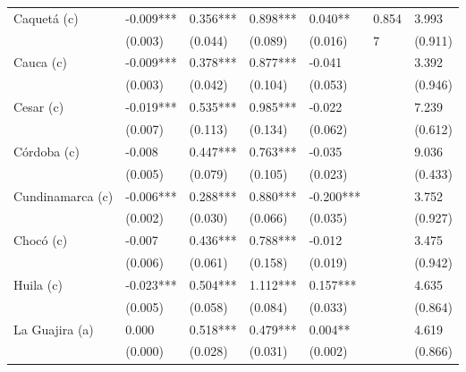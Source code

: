 \begin{table}
\begin{tabular}{lllllll}
\vspace{-0.3cm}Caquetá  (c) & -0.009*** & 0.356*** & 0.898*** & 0.040** & 0.854 & 3.993\\   
& \scriptsize{(0.003)} & \scriptsize{(0.044)} & \scriptsize{(0.089)} & \scriptsize{(0.016)} & \scriptsize{7}    & \scriptsize{(0.911)} \\
\vspace{-0.3cm}Cauca (c) & -0.009*** & 0.378*** & 0.877*** & -0.041 &       & 3.392\\   
& \scriptsize{(0.003)} & \scriptsize{(0.042)} & \scriptsize{(0.104)} & \scriptsize{(0.053)} &       & \scriptsize{(0.946)} \\
\vspace{-0.3cm}Cesar  (c) & -0.019*** & 0.535*** & 0.985*** & -0.022 &       & 7.239\\   
& \scriptsize{(0.007)} & \scriptsize{(0.113)} & \scriptsize{(0.134)} & \scriptsize{(0.062)} &       & \scriptsize{(0.612)} \\
\vspace{-0.3cm}Córdoba (c) & -0.008 & 0.447*** & 0.763*** & -0.035 &       & 9.036\\   
& \scriptsize{(0.005)} & \scriptsize{(0.079)} & \scriptsize{(0.105)} & \scriptsize{(0.023)} &       & \scriptsize{(0.433)} \\
\vspace{-0.3cm}Cundinamarca (c)   & -0.006*** & 0.288*** & 0.880*** & -0.200*** &       & 3.752\\   
& \scriptsize{(0.002)} & \scriptsize{(0.030)} & \scriptsize{(0.066)} & \scriptsize{(0.035)} &       & \scriptsize{(0.927)} \\
\vspace{-0.3cm}Chocó  (c) & -0.007 & 0.436*** & 0.788*** & -0.012 &       & 3.475\\   
& \scriptsize{(0.006)} & \scriptsize{(0.061)} & \scriptsize{(0.158)} & \scriptsize{(0.019)} &       & \scriptsize{(0.942)} \\
\vspace{-0.3cm}Huila  (c) & -0.023*** & 0.504*** & 1.112*** & 0.157*** &       & 4.635\\   
& \scriptsize{(0.005)} & \scriptsize{(0.058)} & \scriptsize{(0.084)} & \scriptsize{(0.033)} &       & \scriptsize{(0.864)} \\
\vspace{-0.3cm}La Guajira  (a) & 0.000 & 0.518*** & 0.479*** & 0.004** &       & 4.619\\   
& \scriptsize{(0.000)} & \scriptsize{(0.028)} & \scriptsize{(0.031)} & \scriptsize{(0.002)} &       & \scriptsize{(0.866)} \\

\end{tabular}
\end{table}
